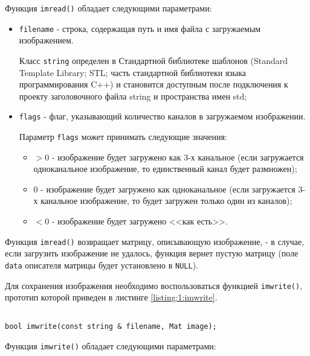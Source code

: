 Функция \verb|imread()| обладает следующими параметрами:

\begin{itemize}

	\item \verb|filename| - строка, содержащая путь и имя файла с загружаемым изображением.

	Класс \verb|string| определен в Стандартной библиотеке шаблонов (Standard Template Library; STL; часть стандартной библиотеки языка программирования C++) и становится доступным после подключения к проекту заголовочного файла string и пространства имен std;

	\item \verb|flags| - флаг, указывающий количество каналов в загружаемом изображении.

	Параметр \verb|flags| может принимать следующие значения:

	\begin{itemize}

		\item $> 0$ - изображение будет загружено как 3-х канальное (если загружается одноканальное изображение, то единственный канал будет размножен);
		\item $0$ - изображение будет загружено как одноканальное (если загружается 3-х канальное изображение, то будет загружен только один из каналов);
		\item $< 0$ - изображение будет загружено <<как есть>>.

	\end{itemize}

\end{itemize}

Функция \verb|imread()| возвращает матрицу, описывающую изображение, - в случае, если загрузить изображение не удалось, функция вернет пустую матрицу (поле \verb|data| описателя матрицы будет установлено в \verb|NULL|).

Для сохранения изображения необходимо воспользоваться функцией \verb|imwrite()|, прототип которой приведен в листинге \ref{listing:1:imwrite}.

\begin{lstlisting}

bool imwrite(const string & filename, Mat image);

\end{lstlisting}
\mylistingend

Функция \verb|imwrite()| обладает следующими параметрами:

